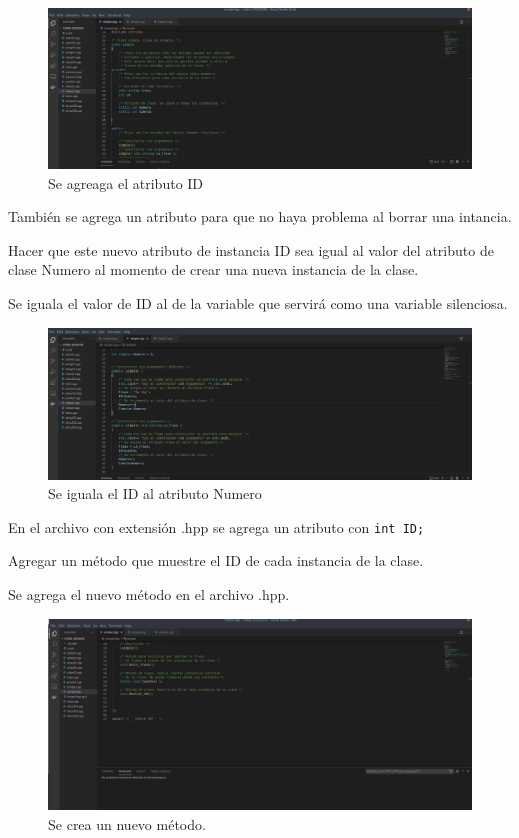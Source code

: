 \documentclass[11pt]{article}
\begin{document}
\begin{figure}[H]
	\centering
	\includegraphics[width=0.7\linewidth]{img2}
	\caption{Se agreaga el atributo ID}
	\label{fig:img2}
\end{figure}

	También se agrega un atributo para que  no haya problema al borrar una intancia.
	\begin{problem}
		Hacer que este nuevo atributo de instancia ID sea igual al valor del atributo de clase Numero al momento de crear una nueva instancia de la clase.
	\end{problem}

Se iguala el valor de ID al de la variable que servirá como una variable silenciosa.

\begin{figure}[H]
	\centering
	\includegraphics[width=0.7\linewidth]{img3}
	\caption{Se iguala el ID al atributo Numero}
	\label{fig:img3}
\end{figure}

En el archivo con extensión .hpp se agrega un atributo con \texttt{int ID;}

	\begin{problem}
		Agregar un método que muestre el ID de cada instancia de la clase.
	\end{problem}

Se agrega el nuevo método en el archivo .hpp.

\begin{figure}[H]
	\centering
	\includegraphics[width=0.7\linewidth]{img4}
	\caption{Se crea un nuevo método.}
	\label{fig:img4}
\end{figure}
\end{document}
